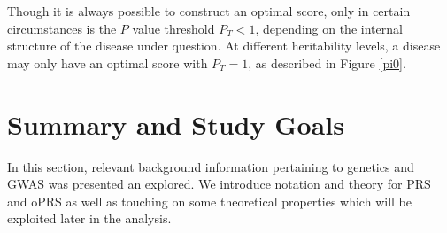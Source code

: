 \begin{rem}
Though it is always possible to construct an optimal score, only in certain circumstances is the $P$ value threshold $P_T < 1$, depending on the internal structure of the disease under question. At different heritability levels, a disease may only have an optimal score with $P_T =1$, as described in Figure \ref{pi0}.
\end{rem} 

\section{Summary and Study Goals}

In this section, relevant background information pertaining to genetics and \ac{GWAS} was presented an explored. We introduce notation and theory for \ac{PRS} and \ac{oPRS} as well as touching on some theoretical properties which will be exploited later in the analysis.

